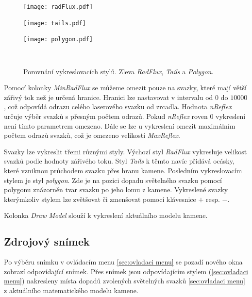 \begin{figure}[h!]
   \centering
   \begin{minipage}[c]{0.3\textwidth}
     \centering \texttt{[image: radFlux.pdf]} 
   \end{minipage}
   \begin{minipage}[c]{0.3\textwidth}
     \centering \texttt{[image: tails.pdf]} 
   \end{minipage}
   \begin{minipage}[c]{0.3\textwidth}
     \centering \texttt{[image: polygon.pdf]}
   \end{minipage}
   \\
   \caption{Porovnání vykreslovacích stylů. Zleva \textit{RadFlux}, \textit{Tails} a \textit{Polygon}.}
   
\end{figure}

Pomocí kolonky \textit{MinRadFlux} se můžeme omezit pouze na svazky, které mají větší zářivý tok než je určená hranice. Hranici lze nastavovat v intervalu od $0$ do $10000$, což odpovídá odrazu celého laserového svazku od zrcadla. Hodnota \textit{nReflex} určuje výběr svazků s přesným počtem odrazů. Pokud \textit{nReflex} roven $ 0 $ vykreslení není tímto parametrem omezeno. Dále se lze u vykreslení omezit maximálním počtem odrazů svazků, což je omezeno velikostí \textit{MaxReflex}. 

Svazky lze vykreslit třemi různými styly. Výchozí styl \textit{RadFlux} vykresluje velikost svazků podle hodnoty zářivého toku. Styl \textit{Tails} k těmto navíc přidává ocásky, které vzniknou průchodem svazku přes hranu kamene.
Posledním vykreslovacím stylem je styl \textit{polygon}. Zde je na pozici dopadu světelného svazku pomocí polygonu znázorněn tvar svazku po jeho lomu z kamene. Vykreslené svazky kterýmkoliv stylem lze zvětšovat či zmenšovat pomocí klávesnice $+$ resp. $-$.  

Kolonka \textit{Draw Model} slouží k vykreslení aktuálního modelu kamene. 


\subsection{Zdrojový snímek}
\label{sec:snimek}
Po výběru snímku v ovládacím menu \ref{sec:ovladaci menu} se pozadí nového okna zobrazí odpovídající snímek. Přes snímek jsou odpovídajícím stylem (\ref{sec:ovladaci menu}) nakresleny místa dopadů zvolených světelných svazků \ref{sec:ovladaci menu} z aktuálního matematického modelu kamene. 

